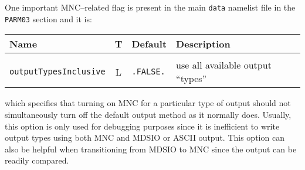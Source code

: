One important MNC--related flag is present in the main \texttt{data}
namelist file in the \texttt{PARM03} section and it is:
\begin{center}
  {\footnotesize
    \begin{tabular}[htb]{|l|c|l|l|}\hline
      \textbf{Name}  &  \textbf{T}  &  
      \textbf{Default}  &  \textbf{Description}  \\\hline
      &  &  &  \\
      \texttt{outputTypesInclusive}  &  L  & \texttt{.FALSE.}  &  
      use all available output ``types''  \\\hline
    \end{tabular}
  }
\end{center}
which specifies that turning on MNC for a particular type of output
should not simultaneously turn off the default output method as it
normally does.  Usually, this option is only used for debugging
purposes since it is inefficient to write output types using both MNC
and MDSIO or ASCII output.  This option can also be helpful when
transitioning from MDSIO to MNC since the output can be readily
compared.

